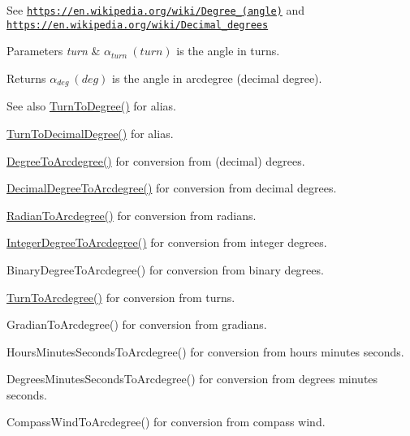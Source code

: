 See \href{https://en.wikipedia.org/wiki/Degree_(angle)}{\tt https\+://en.\+wikipedia.\+org/wiki/\+Degree\+\_\+(angle)} and \href{https://en.wikipedia.org/wiki/Decimal_degrees}{\tt https\+://en.\+wikipedia.\+org/wiki/\+Decimal\+\_\+degrees} 
\begin{DoxyParams}{Parameters}
{\em turn} & $\alpha_{turn}\ (turn)$ is the angle in turns. \\
\hline
\end{DoxyParams}
\begin{DoxyReturn}{Returns}
$\alpha_{deg}\ (deg)$ is the angle in arcdegree (decimal degree). 
\end{DoxyReturn}
\begin{DoxySeeAlso}{See also}
\mbox{\hyperlink{group___e_g_x_math-_angle_conversions-_turn_ga19eceb6db54a1cf17789639c2a869cb9}{Turn\+To\+Degree()}} for alias. 

\mbox{\hyperlink{group___e_g_x_math-_angle_conversions-_turn_ga79231536255e77fb7a158b99a30c1767}{Turn\+To\+Decimal\+Degree()}} for alias. 

\mbox{\hyperlink{group___e_g_x_math-_angle_conversions-_degree_gac1b5f3b68f66c77a6df4ceef842c9b19}{Degree\+To\+Arcdegree()}} for conversion from (decimal) degrees. 

\mbox{\hyperlink{group___e_g_x_math-_angle_conversions-_decimal_degree_gacdd463fcabffeb598ebda65b012ce743}{Decimal\+Degree\+To\+Arcdegree()}} for conversion from decimal degrees. 

\mbox{\hyperlink{group___e_g_x_math-_angle_conversions-_radian_ga3dfdc97357cc07f8379976bbc08f9852}{Radian\+To\+Arcdegree()}} for conversion from radians. 

\mbox{\hyperlink{group___e_g_x_math-_angle_conversions-_integer_degree_gaf633d0b82bfb7586ce86ffbcf78d8f7a}{Integer\+Degree\+To\+Arcdegree()}} for conversion from integer degrees. 

Binary\+Degree\+To\+Arcdegree() for conversion from binary degrees. 

\mbox{\hyperlink{group___e_g_x_math-_angle_conversions-_turn_ga7bdc3a81ce316dd47b1a3179489fa195}{Turn\+To\+Arcdegree()}} for conversion from turns. 

Gradian\+To\+Arcdegree() for conversion from gradians. 

Hours\+Minutes\+Seconds\+To\+Arcdegree() for conversion from hours minutes seconds. 

Degrees\+Minutes\+Seconds\+To\+Arcdegree() for conversion from degrees minutes seconds. 

Compass\+Wind\+To\+Arcdegree() for conversion from compass wind. 
\end{DoxySeeAlso}
\mbox{\label{group___e_g_x_math-_angle_conversions-_turn_ga72cda928d9043c7d82097b1a7920769e}} 
